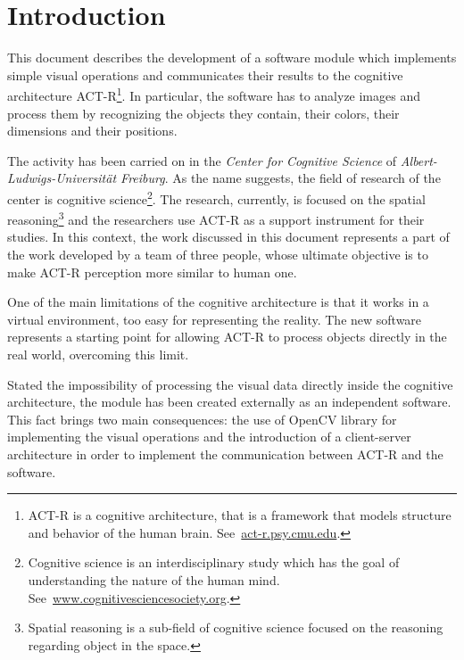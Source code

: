 \chapter{Introduction}
	This document describes the development of a software module which implements simple visual operations and communicates their results to the cognitive architecture \mbox{ACT-R}\footnote{ACT-R is a cognitive architecture, that is a framework that models structure and behavior of the human brain. See~\url{act-r.psy.cmu.edu}.}.
	In particular, the software has to analyze images and process them by recognizing the objects they contain, their colors, their dimensions and their positions.
	

	The activity has been carried on in the \emph{Center for Cognitive Science} of \emph{Albert-Ludwigs-Universität Freiburg}. 
	As the name suggests, the field of research of the center is cognitive science\footnote{Cognitive science is an interdisciplinary study which has the goal of understanding the nature of the human mind. See~\url{www.cognitivesciencesociety.org}.}.
	The research, currently, is focused on the spatial reasoning\footnote{Spatial reasoning is a sub-field of cognitive science focused on the reasoning regarding object in the space.} and the researchers use \mbox{ACT-R} as a support instrument for their studies. 
	In this context, the work discussed in this document represents a part of the work developed by a team of three people, whose ultimate objective is to make \mbox{ACT-R} perception more similar to human one.

	One of the main limitations of the cognitive architecture is that it works in a virtual environment, too easy for representing the reality. 
	The new software represents a starting point for allowing \mbox{ACT-R} to process objects directly in the real world, overcoming this limit.
	
	Stated the impossibility of processing the visual data directly inside the cognitive architecture, the module has been created externally as an independent software.
	This fact brings two main consequences: the use of OpenCV library for implementing the visual operations and the introduction of a client-server architecture in order to implement the communication between \mbox{ACT-R} and the software.

